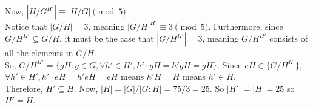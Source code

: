 \documentclass{amsart}
\begin{document}
\begin{enumerate}[itemsep=0.2in]
Now, $|H/G^{H'}|\equiv|H/G|\pmod 5$.\\

Notice that $|G/H|=3$, meaning $|G/H|^{H'}\equiv3\pmod5$. Furthermore, since $G/H^{H'}\subseteq G/H$, it must be the case that $|G/H^{H'}|=3$, meaning $G/H^{H'}$ consists of all the elements in $G/H$.\\

So, $G/H^{H'}=\{gH:g\in G,\forall h'\in H',h'\cdot gH=h'gH=gH\}$. Since $eH\in\{G/H^{H'}\}$, $\forall h'\in H',h'\cdot eH=h'eH=eH$ means $h'H=H$ means $h'\in H$.\\

Therefore, $H'\subseteq H$. Now, $|H|=|G|/|G:H|=75/3=25$. So $|H'|=|H|=25$ so $H'=H$.


\end{enumerate}
\end{document}
